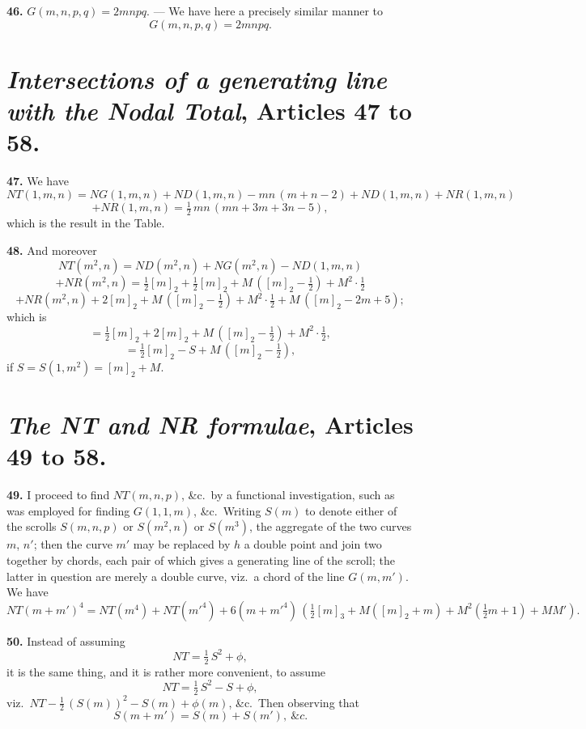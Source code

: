 \documentclass[11pt,a4paper]{article}
\begin{document}
\medskip

\textbf{46.} $G(m, n, p, q) = 2mnpq$. --- We have here a precisely similar manner to
\[
G(m, n, p, q) = 2mnpq.
\]

\section*{\textit{Intersections of a generating line with the Nodal Total}, Articles 47 to 58.}

\textbf{47.} We have
\[
NT(1, m, n) = NG(1, m, n) + ND(1, m, n) - mn\,(m + n - 2) + ND(1, m, n) + NR(1, m, n)
\]
\[
+ NR(1, m, n) = \tfrac{1}{2}\,mn\,(mn + 3m + 3n - 5),
\]
which is the result in the Table.

\medskip

\textbf{48.} And moreover
\[
NT(m^2, n) = ND(m^2, n) + NG(m^2, n) - ND(1, m, n)
\]
\[
+ NR(m^2, n) = \tfrac{1}{2}[m]_2 + \tfrac{1}{2}[m]_2 + M\,([m]_2 - \tfrac{1}{2}) + M^2 \cdot \tfrac{1}{2}
\]
\[
+ NR(m^2, n) + 2[m]_2 + M\,([m]_2 - \tfrac{1}{2}) + M^2 \cdot \tfrac{1}{2} + M\,([m]_2 - 2m + 5);
\]
which is
\[
= \tfrac{1}{2}[m]_2 + 2[m]_2 + M\,([m]_2 - \tfrac{1}{2}) + M^2 \cdot \tfrac{1}{2},
\]
\[
= \tfrac{1}{2}[m]_2 - S + M\,([m]_2 - \tfrac{1}{2}),
\]
if $S = S(1, m^2) = [m]_2 + M$.

\section*{\textit{The NT and NR formulae}, Articles 49 to 58.}

\textbf{49.} I proceed to find $NT(m, n, p)$, \&c.\ by a functional investigation, such as was employed for finding $G(1, 1, m)$, \&c.\ Writing $S(m)$ to denote either of the scrolls $S(m, n, p)$ or $S(m^2, n)$ or $S(m^3)$, the aggregate of the two curves $m$, $n'$; then the curve $m'$ may be replaced by $h$ a double point and join two together by chords, each pair of which gives a generating line of the scroll; the latter in question are merely a double curve, viz.\ a chord of the line $G(m, m')$. We have
\[
NT(m + m')^4 = NT(m^4) + NT(m'^4) + 6(m + m'^4)\,(\tfrac{1}{2}[m]_3 + M([m]_2 + m) + M^2(\tfrac{1}{2}m + 1) + MM').
\]

\medskip

\textbf{50.} Instead of assuming
\[
NT = \tfrac{1}{2}\,S^2 + \phi,
\]
it is the same thing, and it is rather more convenient, to assume
\[
NT = \tfrac{1}{2}\,S^2 - S + \phi,
\]
viz.\ $NT - \tfrac{1}{2}\,(S(m))^2 - S(m) + \phi(m)$, \&c.\ Then observing that
\[
S(m+m') = S(m) + S(m'),\ \&c.
\]
\end{document}
